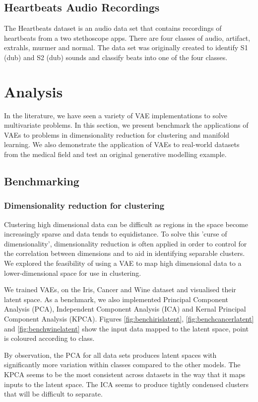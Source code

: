 \documentclass[12pt]{article}
\begin{document}
\subsection{Heartbeats Audio Recordings}
The Heartbeats dataset \citep{pascal-chsc-2011} is an audio data set that contains recordings of heartbeats from a two stethoscope apps. There are four classes of audio, artifact, extrahls, murmer and normal. The data set was originally created to identify S1 (dub) and S2 (dub) sounds and classify beats into one of the four classes.  
\newpage
\section{Analysis}
In the literature, we have seen a variety of VAE implementations to solve multivariate problems. In this section, we present benchmark the applications of VAEs to problems in dimensionality reduction for clustering and manifold learning. We also demonstrate the application of VAEs to real-world datasets from the medical field and test an original generative modelling example. 
\subsection{Benchmarking}
\subsubsection{Dimensionality reduction for clustering}
Clustering high dimensional data can be difficult as regions in the space become increasingly sparse and data tends to equidistance. To solve this 'curse of dimensionality', dimensionality reduction is often applied in order to control for the correlation between dimensions and to aid in identifying separable clusters. We explored the feasibility of using a VAE to map high dimensional data to a lower-dimensional space for use in clustering.

We trained VAEs, on the Iris, Cancer and Wine dataset and visualised their latent space. As a benchmark, we also implemented Principal Component Analysis (PCA), Independent Component Analysis (ICA) and Kernal Principal Component Analysis (KPCA). Figures \ref{fig:benchirislatent}, \ref{fig:benchcancerlatent} and \ref{fig:benchwinelatent} show the input data mapped to the latent space, point is coloured according to class. 

By observation, the PCA for all data sets produces latent spaces with significantly more variation within classes compared to the other models. The KPCA seems to be the most consistent across datasets in the way that it maps inputs to the latent space. The ICA seems to produce tightly condensed clusters that will be difficult to separate.
\end{document}

